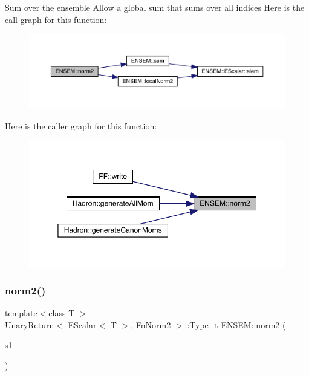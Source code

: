 Sum over the ensemble Allow a global sum that sums over all indices Here is the call graph for this function\+:\nopagebreak
\begin{figure}[H]
\begin{center}
\leavevmode
\includegraphics[width=350pt]{d2/d94/namespaceENSEM_a846e917e7120ca978ffdb7146357bf07_cgraph}
\end{center}
\end{figure}
Here is the caller graph for this function\+:\nopagebreak
\begin{figure}[H]
\begin{center}
\leavevmode
\includegraphics[width=350pt]{d2/d94/namespaceENSEM_a846e917e7120ca978ffdb7146357bf07_icgraph}
\end{center}
\end{figure}
\mbox{\label{namespaceENSEM_afe2995777022f093a0938da761cb5ac3}} 
\subsubsection{\texorpdfstring{norm2()}{norm2()}\hspace{0.1cm}{\footnotesize\ttfamily [2/3]}}
{\footnotesize\ttfamily template$<$class T $>$ \\
\mbox{\hyperlink{structENSEM_1_1UnaryReturn}{Unary\+Return}}$<$ \mbox{\hyperlink{classENSEM_1_1EScalar}{E\+Scalar}}$<$ T $>$, \mbox{\hyperlink{structENSEM_1_1FnNorm2}{Fn\+Norm2}} $>$\+::Type\+\_\+t E\+N\+S\+E\+M\+::norm2 (\begin{DoxyParamCaption}\item[{const \mbox{\hyperlink{classXMLArray_1_1Array}{Array}}$<$ \mbox{\hyperlink{classENSEM_1_1EScalar}{E\+Scalar}}$<$ T $>$ $>$ \&}]{s1 }\end{DoxyParamCaption})\hspace{0.3cm}{\ttfamily [inline]}}



